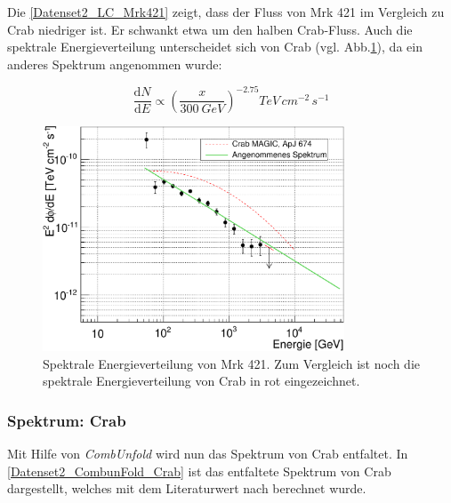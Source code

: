 Die \autoref{Datenset2_LC_Mrk421} zeigt, dass der Fluss von Mrk 421 im Vergleich zu Crab niedriger ist.
Er schwankt etwa um den halben Crab-Fluss.
Auch die spektrale Energieverteilung unterscheidet sich von Crab (vgl. Abb.\ref{Datenset2_SED_Mrk421}), da ein anderes Spektrum angenommen wurde:

\begin{equation}
\frac{\mathrm{d}N}{\mathrm{d}E}\propto \left(\frac{x}{\SI{300}{GeV}}\right)^{-2.75}\si{TeV\,cm^{-2}\,s^{-1}}
\end{equation}


\begin{figure}
    \centering
    \includegraphics[width=0.8\textwidth]{./Plots/04_MrkAnalyse/Datenset2/SED_Mrk421.pdf}
    \caption{Spektrale Energieverteilung von Mrk 421.
    Zum Vergleich ist noch die spektrale Energieverteilung von Crab in rot eingezeichnet.}
    \label{Datenset2_SED_Mrk421}
\end{figure}


\subsubsection{Spektrum: Crab}
Mit Hilfe von \textit{CombUnfold} wird nun das Spektrum von Crab entfaltet.
In \autoref{Datenset2_CombunFold_Crab} ist das entfaltete Spektrum von Crab dargestellt, welches mit dem Literaturwert nach \cite{LiteraturreferenzMAGIC} berechnet wurde.

